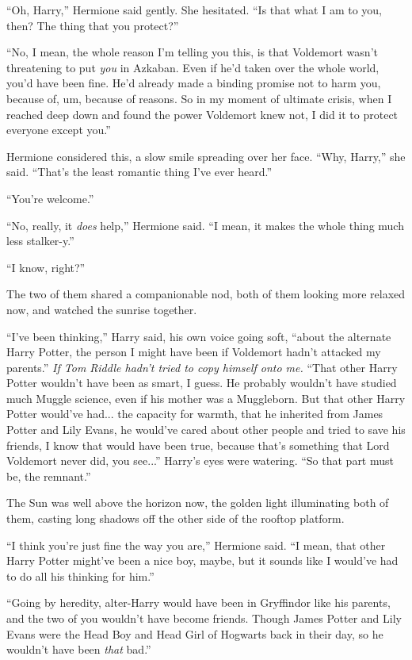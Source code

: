 ``Oh, Harry,'' Hermione said gently. She hesitated. ``Is that what I am to you, then? The thing that you protect?''

``No, I mean, the whole reason I'm telling you this, is that Voldemort wasn't threatening to put \emph{you} in Azkaban. Even if he'd taken over the whole world, you'd have been fine. He'd already made a binding promise not to harm you, because of, um, because of reasons. So in my moment of ultimate crisis, when I reached deep down and found the power Voldemort knew not, I did it to protect everyone except you.''

Hermione considered this, a slow smile spreading over her face. ``Why, Harry,'' she said. ``That's the least romantic thing I've ever heard.''

``You're welcome.''

``No, really, it \emph{does} help,'' Hermione said. ``I mean, it makes the whole thing much less stalker-y.''

``I know, right?''

The two of them shared a companionable nod, both of them looking more relaxed now, and watched the sunrise together.

``I've been thinking,'' Harry said, his own voice going soft, ``about the alternate Harry Potter, the person I might have been if Voldemort hadn't attacked my parents.'' \emph{If Tom Riddle hadn't tried to copy himself onto me.} ``That other Harry Potter wouldn't have been as smart, I guess. He probably wouldn't have studied much Muggle science, even if his mother was a Muggleborn. But that other Harry Potter would've had... the capacity for warmth, that he inherited from James Potter and Lily Evans, he would've cared about other people and tried to save his friends, I know that would have been true, because that's something that Lord Voldemort never did, you see...'' Harry's eyes were watering. ``So that part must be, the remnant.''

The Sun was well above the horizon now, the golden light illuminating both of them, casting long shadows off the other side of the rooftop platform.

``I think you're just fine the way you are,'' Hermione said. ``I mean, that other Harry Potter might've been a nice boy, maybe, but it sounds like I would've had to do all his thinking for him.''

``Going by heredity, alter-Harry would have been in Gryffindor like his parents, and the two of you wouldn't have become friends. Though James Potter and Lily Evans were the Head Boy and Head Girl of Hogwarts back in their day, so he wouldn't have been \emph{that} bad.''

